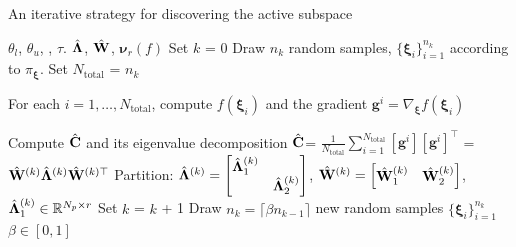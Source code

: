 \bigskip
\begin{breakablealgorithm}
\renewcommand{\algorithmicrequire}{\textbf{Input:}}
\renewcommand{\algorithmicensure}{\textbf{Output:}}
  \caption{An iterative strategy for discovering the active subspace}
  \begin{algorithmic}[1]
\Require $\theta_l$, $\theta_u$, \rebut{$\beta$}, $\tau$. 
\Ensure $\hat{\mathbf{{\Lambda}}}$, $\hat{\mathbf{{W}}}$, $\bm{\nu}_r(f)$ %
    \State Set $k$ = 0
	\State Draw $n_k$ random samples, $\{\bm{\xi}_i\}_{i=1}^{n_k}$ 
         according to $\pi_{\bm{\xi}}$. 
    \State Set $N_\text{total}$ = $n_k$ 

	\State For each $i=1, \ldots, N_\text{total}$, compute $f(\bm{\xi}_i)$ and the gradient $\bm{g}^i = \nabla_{\bm{\xi}}f(\bm{\xi}_i)$

	\State Compute $\hat{\mathbf{{C}}}$ and its eigenvalue decomposition 
		$\hat{\mathbf{{C}}}$= $\frac{1}{N_\text{total}}\sum\limits_{i=1}^{N_\text{total}}[\bm{g}^i][\bm{g}^i]^\top$ = 
		$\hat{\mathbf{{W}}}^{(k)}\hat{\mathbf{{\Lambda}}}^{(k)} \hat{\mathbf{{W}}}^{(k)\top}$
	\State Partition: $\hat{\mathbf{{\Lambda}}}^{(k)}=
        \begin{bmatrix} \hat{\mathbf{{\Lambda}}}_1^{(k)} & \\ & \hat{\mathbf{{\Lambda}}}_2^{(k)} \end{bmatrix}$, 
        $\hat{\mathbf{{W}}}^{(k)}=\begin{bmatrix} \hat{\mathbf{{W}}}_1^{(k)} & \hat{\mathbf{{W}}}_2^{(k)} \end{bmatrix}$, 
        $\hat{\mathbf{{\Lambda}}}_1^{(k)}\in \mathbb{R}^{N_p\times r}$
	\Loop
		\State Set $k$ = $k$ + 1
		\State Draw $n_k =  \lceil\beta n_{k-1}\rceil$  new random samples 
                $\{\bm{\xi}_i\}_{i=1}^{n_k}$  $\beta\in[0,1]$
                

\end{algorithmic}
\end{breakablealgorithm}
